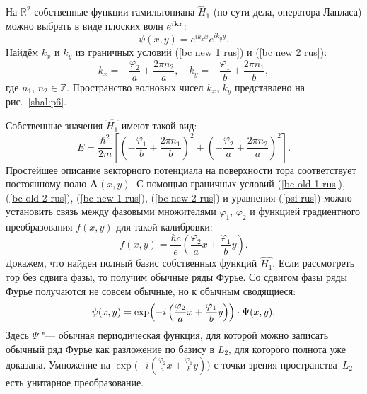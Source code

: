 На $\mathbb R^2$ собственные функции гамильтониана $\hat H_1$ (по сути дела, оператора Лапласа) можно выбрать в виде плоских волн $e^{i\bf{kr}}$:
$$ \psi(x,y)=e^{ik_x x}e^{ik_y y}. $$
Найдём $k_x$ и $k_y$ из граничных условий (\ref{bc new 1 rus}) и (\ref{bc new 2 rus}):
$$
k_x=- \frac{\varphi_2}{a}+\frac{2\pi n_2}{a}, \quad 
k_y=- \frac{\varphi_1}{b}+\frac{2\pi n_1}{b},
$$
где $n_1$, $n_2 \in{\mathbb Z}$.
Пространство волновых чисел $k_x$, $k_y$ представлено на рис.~\ref{shal:p6}.


Собственные значения $\hat{H_1}$ имеют такой вид:
$$
E=\frac{\hbar^2}{2m}\left[\left(- \frac{\varphi_1}{b}+\frac{2\pi n_1}{b}\right)^2+\left(- \frac{\varphi_2}{a}+\frac{2\pi n_2}{a}\right)^2\right].
$$
Простейшее описание векторного потенциала на поверхности тора соответствует постоянному полю $\mathbf{A}(x, y)$.
С помощью граничных условий (\ref{bc old 1 rus}), (\ref{bc old 2 rus}), (\ref{bc new 1 rus}), (\ref{bc new 2 rus}) и уравнения (\ref{psi rus}) можно установить связь между фазовыми множителями $\varphi_1$, $\varphi_2$ и функцией градиентного преобразования $f(x,y)$ для такой калибровки:
$$
f(x,y)=\frac{\hbar c}{e}\left(\frac{\varphi_{2}}{a}x+\frac{\varphi_{1}}{b}y\right).$$
Докажем, что найден полный базис собственных функций $\hat{H_1}$.
Если рассмотреть тор без сдвига фазы, то получим обычные ряды Фурье. 
Со сдвигом фазы ряды Фурье получаются не совсем обычные, но к обычным сводящиеся:
$$
   \psi(x,y)=\exp\Bigl({-i\left(\frac{\varphi_{2}}{a}x+\frac{\varphi_{1}}{b}y\right)}\Bigr)\cdot \Psi(x,y).
$$
Здесь $\Psi$ "--- обычная периодическая функция, для которой можно записать обычный ряд Фурье как разложение по базису в $L_2$, для которого полнота уже доказана.
Умножение на $\exp\bigl({-i\left(\frac{\varphi_{2}}{a}x+\frac{\varphi_{1}}{b}y\right)}\bigr)$ с точки зрения пространства~$L_2$ есть унитарное преобразование.

